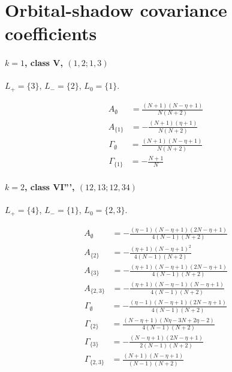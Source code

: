 \documentclass[11pt]{article}
\begin{document}
\section*{Orbital-shadow covariance coefficients}

\paragraph{$k=1$, class V, $(1,2;1,3)$}

$L_+=\{3\}$, $L_-=\{2\}$, $L_0=\{1\}$.

\begin{align*}
  A_{\emptyset} &= \frac{\left(N + 1\right) \left(N - \eta + 1\right)}{N \left(N + 2\right)} \\
  A_{\{1\}} &= - \frac{\left(N + 1\right) \left(\eta + 1\right)}{N \left(N + 2\right)} 
\end{align*}
\begin{align*}
  \Gamma_{\emptyset} &= \frac{\left(N + 1\right) \left(N - \eta + 1\right)}{N \left(N + 2\right)} \\
  \Gamma_{\{1\}} &= - \frac{N + 1}{N} 
\end{align*}

\paragraph{$k=2$, class VI''', $(12,13;12,34)$}

$L_+=\{4\}$, $L_-=\{1\}$, $L_0=\{2,3\}$.

\begin{align*}
  A_{\emptyset} &= - \frac{\left(\eta - 1\right) \left(N - \eta + 1\right) \left(2 N - \eta + 1\right)}{4 \left(N - 1\right) \left(N + 2\right)} \\
  A_{\{2\}} &= - \frac{\left(\eta + 1\right) \left(N - \eta + 1\right)^{2}}{4 \left(N - 1\right) \left(N + 2\right)} \\
  A_{\{3\}} &= - \frac{\left(\eta + 1\right) \left(N - \eta + 1\right) \left(2 N - \eta + 1\right)}{4 \left(N - 1\right) \left(N + 2\right)} \\
  A_{\{2,3\}} &= - \frac{\left(\eta + 1\right) \left(N - \eta - 1\right) \left(N - \eta + 1\right)}{4 \left(N - 1\right) \left(N + 2\right)} 
\end{align*}
\begin{align*}
  \Gamma_{\emptyset} &= - \frac{\left(\eta - 1\right) \left(N - \eta + 1\right) \left(2 N - \eta + 1\right)}{4 \left(N - 1\right) \left(N + 2\right)} \\
  \Gamma_{\{2\}} &= \frac{\left(N - \eta + 1\right) \left(N \eta - 3 N + 2 \eta - 2\right)}{4 \left(N - 1\right) \left(N + 2\right)} \\
  \Gamma_{\{3\}} &= - \frac{\left(N - \eta + 1\right) \left(2 N - \eta + 1\right)}{2 \left(N - 1\right) \left(N + 2\right)} \\
  \Gamma_{\{2,3\}} &= \frac{\left(N + 1\right) \left(N - \eta + 1\right)}{\left(N - 1\right) \left(N + 2\right)} 
\end{align*}
\end{document}
